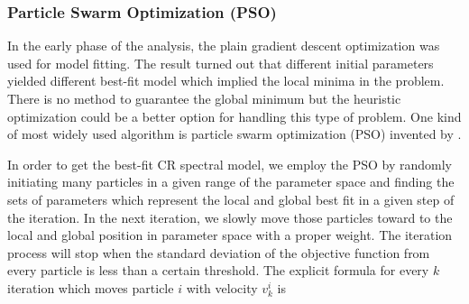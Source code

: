 


\subsubsection{Particle Swarm Optimization (PSO)}

In the early phase of the analysis, the plain gradient descent 
optimization was used for model fitting. The result turned out 
that different initial
parameters yielded different best-fit model which implied
the local minima in the problem.
There is no method to guarantee the global minimum but the heuristic
optimization could be a better option for handling this type of problem.
One kind of most widely used algorithm is particle swarm
optimization (PSO) invented by \cite{pso_optimize}.

In order to get the best-fit CR spectral model, we employ the PSO
by randomly initiating many particles in a given range of
the parameter space and finding the sets of parameters which represent the
local and global best fit in a given step of the iteration.
In the next iteration, we slowly move those particles %
toward to the local and global position in parameter space with a proper weight. 
The iteration process will stop when the standard deviation of the objective function from 
every particle is less than a certain threshold.
The explicit formula for every
$k$ iteration which moves particle $i$ with velocity $v_k^i$ is

